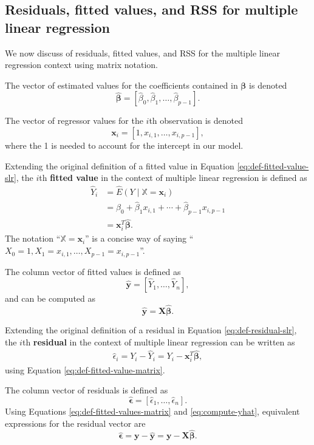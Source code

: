 \documentclass[
]{book}
\theoremstyle{definition}
\theoremstyle{definition}
\theoremstyle{definition}
\theoremstyle{definition}
\theoremstyle{remark}
\begin{document}
\hypertarget{ss:fv-resid-rss-mlr}{%
\subsection{Residuals, fitted values, and RSS for multiple linear regression}\label{ss:fv-resid-rss-mlr}}

We now discuss of residuals, fitted values, and RSS for the multiple linear regression context using matrix notation.

The vector of estimated values for the coefficients contained in \(\boldsymbol{\beta}\) is denoted
\[
\hat{\boldsymbol{\beta}}=[\hat{\beta}_0,\hat{\beta}_1,\ldots,\hat{\beta}_{p-1}]. \label{eq:def-beta-matrix}
\]

The vector of regressor values for the \(i\)th observation is denoted
\[
\mathbf{x}_i=[1,x_{i,1},\ldots,x_{i,p-1}], \label{eq:def-ith-regressor-matrix}
\]
where the 1 is needed to account for the intercept in our model.

Extending the original definition of a fitted value in Equation \eqref{eq:def-fitted-value-slr}, the \(i\)th \textbf{fitted value} in the context of multiple linear regression is defined as
\[
\begin{aligned}
\hat{Y}_i &= \hat{E}(Y \mid \mathbb{X} = \mathbf{x}_i) \\
&= \hat{\beta}_0 + \hat{\beta}_1 x_{i,1} + \cdots + \hat{\beta}_{p-1} x_{i,p-1} \\
&= \mathbf{x}_i^T\hat{\boldsymbol{\beta}}.
\end{aligned}
\label{eq:def-fitted-value-matrix}
\]
The notation ``\(\mathbb{X} = \mathbf{x}_i\)'' is a concise way of saying ``\(X_0 = 1, X_1=x_{i,1}, \ldots, X_{p-1}=x_{i,p-1}\)''.

The column vector of fitted values is defined as
\[
\hat{\mathbf{y}} = [\hat{Y}_1,\ldots,\hat{Y}_n], \label{eq:def-fitted-values-matrix}
\]
and can be computed as
\[
\hat{\mathbf{y}} = \mathbf{X}\hat{\boldsymbol{\beta}}. \label{eq:compute-yhat}
\]

Extending the original definition of a residual in Equation \eqref{eq:def-residual-slr},
the \(i\)th \textbf{residual} in the context of multiple linear regression can be written as
\[
\begin{aligned}
\hat{\epsilon}_i = Y_i - \hat{Y}_i=Y_i-\mathbf{x}_i^T\hat{\boldsymbol{\beta}},
\end{aligned}
\]
using Equation \eqref{eq:def-fitted-value-matrix}.

The column vector of residuals is defined as
\[
\hat{\boldsymbol{\epsilon}} = [\hat{\epsilon}_1,\ldots,\hat{\epsilon}_n]. \label{eq:def-residuals-matrix}
\]
Using Equations \eqref{eq:def-fitted-values-matrix} and \eqref{eq:compute-yhat}, equivalent expressions for the residual vector are
\[
\hat{\boldsymbol{\epsilon}}=\mathbf{y}-\hat{\mathbf{y}}=\mathbf{y}-\mathbf{X}\hat{\boldsymbol{\beta}}.\label{eq:epsilonhat-expressions}
\]
\end{document}
